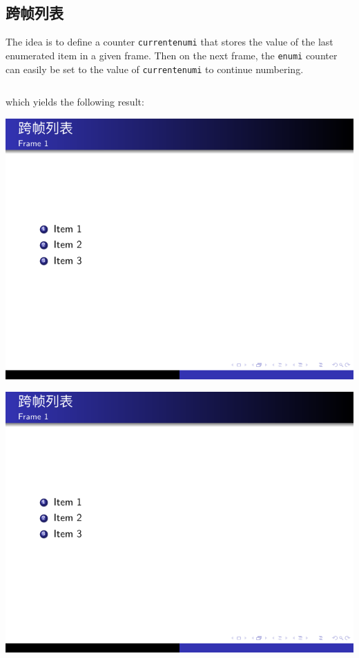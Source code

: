\subsection{跨帧列表}

The idea is to define a counter \verb|currentenumi| that stores the value of the last enumerated item in a given frame. Then on the next frame, the \verb|enumi| counter can easily be set to the value of \verb|currentenumi| to continue numbering.

\inputminted[linenos=true]{latex}{examples/beamer/list-entries-shifted-to-next-frame.tex}

which yields the following result:

\includegraphics[page=1]{examples/beamer/list-entries-shifted-to-next-frame.pdf}

\includegraphics[page=2]{examples/beamer/list-entries-shifted-to-next-frame.pdf}

